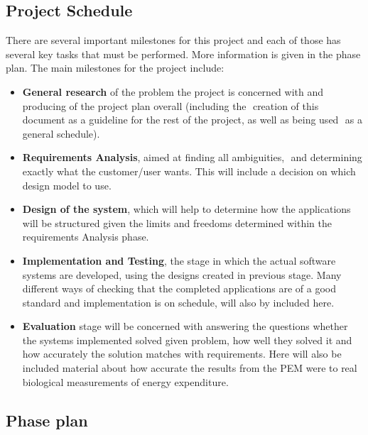 \documentclass[12pt, a4paper]{report}   %
\begin{document}
\subsection{Project Schedule}
There are several important milestones for this project and each of those has several key tasks that must be performed. More information is given in the phase plan.
The main milestones for the project include:
\begin{itemize}
\item \textbf{General research} of the problem the project is concerned with and producing of the project plan overall (including the  creation of this document as a guideline for the rest of the project, as well as being used  as a general schedule). 

\item \textbf{Requirements Analysis}, aimed at finding all ambiguities,  and determining exactly what the customer/user wants. This will include a decision on which  design model to use.

\item \textbf{Design of the system}, which will help to determine how the applications will be structured given the limits and freedoms determined within the requirements Analysis phase.

\item \textbf{Implementation and Testing}, the stage in which the actual software systems are developed, using the designs created in previous stage. Many different ways of checking that the completed applications are of a good standard and implementation is on schedule, will also by included here.

\item \textbf{Evaluation} stage will be concerned with answering the questions whether the systems implemented solved given problem, how well they solved it and how accurately the solution matches with requirements. Here will also be included material about how accurate the results from the PEM were to real biological measurements of energy expenditure.
\end{itemize}

\subsection{Phase plan}
\end{document}
